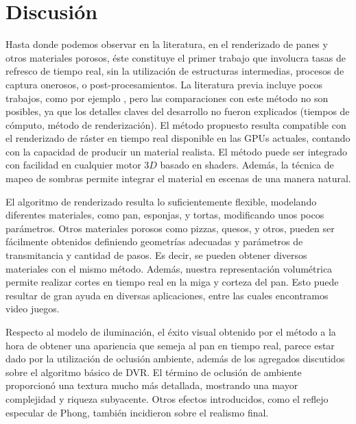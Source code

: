 \section{Discusión}

Hasta donde podemos observar en la literatura, en el renderizado de panes y otros materiales porosos, éste constituye el primer trabajo que involucra tasas de refresco de tiempo real, sin la utilización de estructuras intermedias, procesos de captura onerosos, o post-procesamientos.
La literatura previa incluye pocos trabajos, como por ejemplo \cite{Cho2007}, pero las comparaciones con este método no son posibles, ya que los detalles claves del desarrollo no fueron explicados (tiempos de cómputo, método de renderización).
El método propuesto resulta compatible con el renderizado de ráster en tiempo real disponible en las GPUs actuales, contando con la capacidad de producir un material realista.
El método puede ser integrado con facilidad en cualquier motor $3D$ basado en shaders.
Además, la técnica de mapeo de sombras permite integrar el material en escenas de una manera natural.


El algoritmo de renderizado resulta lo suficientemente flexible, modelando diferentes materiales, como pan, esponjas, y tortas, modificando unos pocos parámetros.
Otros materiales porosos como pizzas, quesos, y otros, pueden ser fácilmente obtenidos definiendo geometrías adecuadas y parámetros de transmitancia y cantidad de pasos.
Es decir, se pueden obtener diversos materiales con el mismo método.
Además, nuestra representación volumétrica permite realizar cortes en tiempo real en la miga y corteza del pan.
Esto puede resultar de gran ayuda en diversas aplicaciones, entre las cuales encontramos video juegos.

Respecto al modelo de iluminación, el éxito visual obtenido por el método a la hora de obtener una apariencia que semeja al pan en tiempo real, parece estar dado por la utilización de oclusión ambiente, además de los agregados discutidos sobre el algoritmo básico de DVR.
El término de oclusión de ambiente proporcionó una textura mucho más detallada, mostrando una mayor complejidad y riqueza subyacente.
Otros efectos introducidos, como el reflejo especular de Phong, también incidieron sobre el realismo final.


